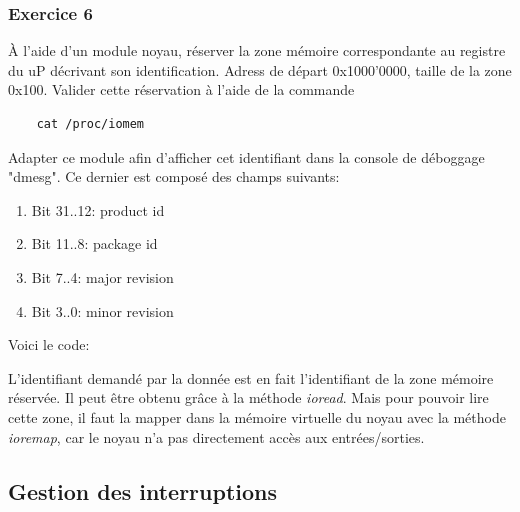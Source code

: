 \subsubsection{Exercice 6}
À l'aide d'un module noyau, réserver la zone mémoire correspondante au registre du uP décrivant son identification. Adress de départ 0x1000'0000, taille de la zone 0x100. Valider cette réservation à l'aide de la commande 
\begin{lstlisting}
	cat /proc/iomem
\end{lstlisting}
Adapter ce module afin d'afficher cet identifiant dans la console de déboggage "dmesg". Ce dernier est composé des champs suivants:
\begin{enumerate}
	\item Bit 31..12: product id
	\item Bit 11..8: package id
	\item Bit 7..4: major revision
	\item Bit 3..0: minor revision\\
\end{enumerate}

Voici le code:


L'identifiant demandé par la donnée est en fait l'identifiant de la zone mémoire réservée. Il peut être obtenu grâce à la méthode \textit{ioread}. Mais pour pouvoir lire cette zone, il faut la mapper dans la mémoire virtuelle du noyau avec la méthode \textit{ioremap}, car le noyau n'a pas directement accès aux entrées/sorties.
	
\subsection{Gestion des interruptions}
